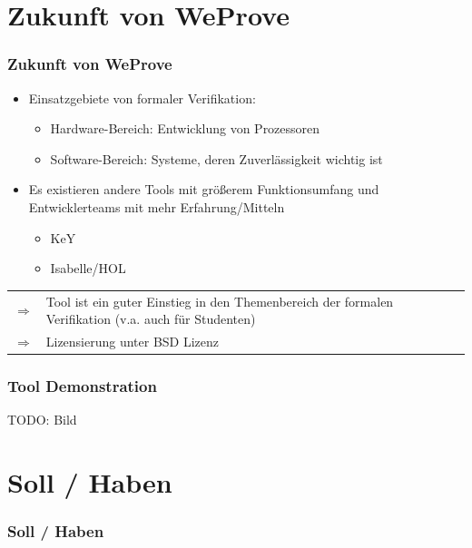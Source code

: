 \documentclass{beamer}
\newcommand{\WProve}{W\tiny{}e\Large{}Prove}
\begin{document}
\section{Zukunft von \WProve}
\begin{frame}
\frametitle{Zukunft von \WProve}
\begin{itemize}
\item Einsatzgebiete von formaler Verifikation:
\begin{itemize}
\item Hardware-Bereich: Entwicklung von Prozessoren
\item Software-Bereich: Systeme, deren Zuverlässigkeit wichtig ist
\end{itemize}
\item Es existieren andere Tools mit größerem Funktionsumfang und
Entwicklerteams mit mehr Erfahrung/Mitteln
\begin{itemize}
\item KeY
\item Isabelle/HOL
\end{itemize}
\end{itemize}
\begin{tabular}{p{1mm}p{10.9cm}}
$\Rightarrow$ & Tool ist ein guter Einstieg in den Themenbereich der formalen
Verifikation (v.a. auch für Studenten)\\
$\Rightarrow$ & Lizensierung unter BSD Lizenz
\end{tabular}
\end{frame}

\begin{frame}
\frametitle{Tool Demonstration}
TODO: Bild
\end{frame}

\section{Soll / Haben}
\begin{frame}
\frametitle{Soll / Haben}
\end{frame}
\end{document}
